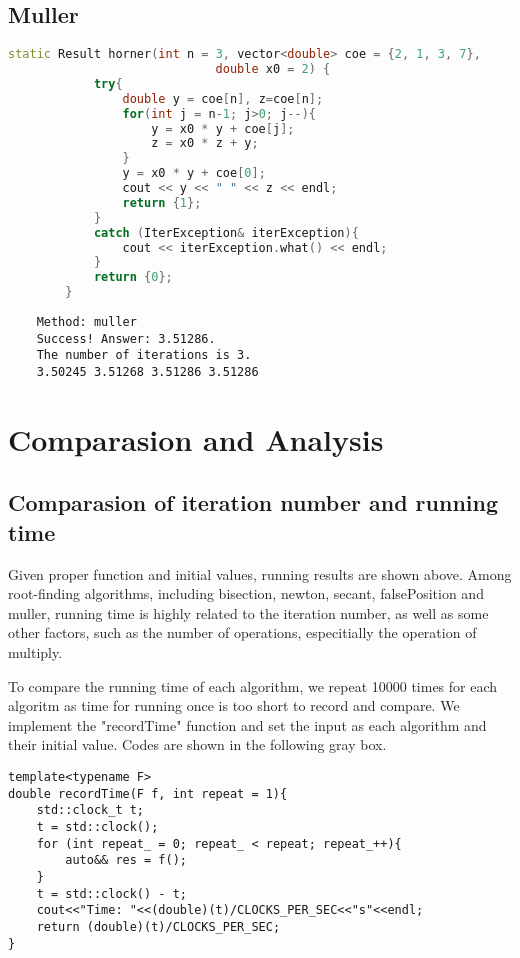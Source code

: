 \documentclass{article}
\begin{document}
\subsection{Muller}
\begin{lstlisting}[language=c++]
    static Result horner(int n = 3, vector<double> coe = {2, 1, 3, 7},
                             double x0 = 2) {
            try{
                double y = coe[n], z=coe[n];
                for(int j = n-1; j>0; j--){
                    y = x0 * y + coe[j];
                    z = x0 * z + y;
                }
                y = x0 * y + coe[0];
                cout << y << " " << z << endl;
                return {1};
            }
            catch (IterException& iterException){
                cout << iterException.what() << endl;
            }
            return {0};
        }
\end{lstlisting}

\begin{lstlisting}
    Method: muller
    Success! Answer: 3.51286.
    The number of iterations is 3.
    3.50245 3.51268 3.51286 3.51286
\end{lstlisting}

\section{Comparasion and Analysis}

\subsection{Comparasion of iteration number and running time}

    Given proper function and initial values, running results are shown above. Among root-finding algorithms, including bisection, newton, secant, falsePosition and muller, running time is highly related to the iteration number, as well as some other factors, such as the number of operations, especitially the operation of multiply.

    To compare the running time of each algorithm, we repeat 10000 times for each algoritm as time for running once is too short to record and compare. We implement the "recordTime" function and set the input as each algorithm and their initial value. Codes are shown in the following gray box.

    \begin{lstlisting}
template<typename F>
double recordTime(F f, int repeat = 1){
    std::clock_t t;
    t = std::clock();
    for (int repeat_ = 0; repeat_ < repeat; repeat_++){
        auto&& res = f();
    }
    t = std::clock() - t;
    cout<<"Time: "<<(double)(t)/CLOCKS_PER_SEC<<"s"<<endl;
    return (double)(t)/CLOCKS_PER_SEC;
}
    \end{lstlisting}
    
\end{document}
